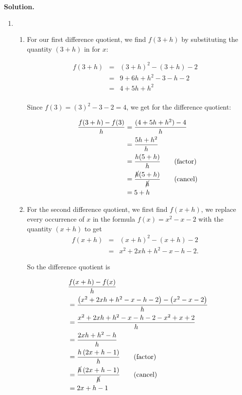 \begin{ex}
\begin{enumerate}
\end{enumerate}

{\bf Solution.}
 
\begin{enumerate}

\item \begin{enumerate} \item For our first difference quotient, we find $f(3+h)$ by substituting the quantity $(3+h)$ in for $x$: 

\[ \begin{array}{rclr}  
  f(3+h) & = & (3+h)^2 - (3+h) -2 & \\ 
  & = & 9 + 6h+h^2 - 3 - h -2 & \\
 & = & 4 + 5h + h^2 & \\
 \end{array} \]

Since $f(3) = (3)^2-3-2 = 4$, we get for the difference quotient:

\begin{align*}
\dfrac{f(3+h)-f(3)}{h} & = \dfrac{(4 + 5h + h^2) -4}{h} \\
                                & = \dfrac{5h+h^2}{h} \\
                                & = \dfrac{h(5+h)}{h} \tag{factor} \\
                                & = \dfrac{\cancel{h}(5+h)}{\cancel{h}} \tag{cancel} \\
                                & = 5+h
\end{align*}				


\item For the second difference quotient, we first find $f(x+h)$, we replace every occurrence of $x$ in the formula $f(x) = x^2-x-2$ with the quantity $(x+h)$ to get \[ \begin{array}{rclr}  
 
 f(x+h) & = & (x+h)^2 - (x+h) -2 & \\ [8pt]
 & = & x^2 + 2xh + h^2 - x - h - 2.
 \end{array} \]

So the difference quotient is

\begin{align*}
& \dfrac{f(x+h)-f(x)}{h} \\
& = \dfrac{\left(x^2+2xh+h^2-x-h-2 \right)-\left(x^{2}-x-2 \right)}{h} \\
& = \dfrac{x^2+2xh+h^2-x-h-2-x^2+x+2}{h} \\
& = \dfrac{2xh+h^2-h}{h} \\ 
& = \dfrac{h \left(2x+h-1\right)}{h} \tag{factor} \\
& = \dfrac{\cancel{h} \left(2x+h-1\right)}{\cancel{h}} \tag{cancel} \\
& = 2x+h-1
\end{align*}


\end{enumerate}
\end{enumerate}
\end{ex}
